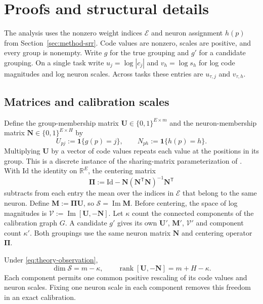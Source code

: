 \section{Proofs and structural details}
\label{app:theory-proofs}

The analysis uses the nonzero weight indices $\mathcal E$ and neuron
assignment $h(p)$ from Section~\ref{sec:method-srr}. Code values are
nonzero, scales are positive, and every group is nonempty.
Write $g$ for the true grouping and $g'$ for a candidate grouping.
On a single task write
$u_j=\log|c_j|$ and $v_h=\log s_h$ for log code magnitudes and
log neuron scales. Across tasks these entries are $u_{\tau,j}$
and $v_{\tau,h}$.

\subsection{Matrices and calibration scales}
\label{app:theory-dimension}

Define the group-membership matrix
$\mathbf U\in\{0,1\}^{E\times m}$ and the
neuron-membership matrix $\mathbf N\in\{0,1\}^{E\times H}$ by
\begin{equation}
    U_{pj}
        :=\mathbf1\{g(p)=j\},
    \qquad
    N_{ph}:=\mathbf1\{h(p)=h\}.
    \label{eq:theory-membership}
\end{equation}
Multiplying $\mathbf U$ by a vector of code values repeats each
value at the positions in its group. This is a discrete instance of
the sharing-matrix parameterization of \citet[Eq.~(2)]{zhou2021meta}.
With $\mathrm{Id}$ the identity on $\mathbb R^E$, the centering matrix
\begin{equation}
    \boldsymbol\Pi
    :=\mathrm{Id}-\mathbf N
        (\mathbf N^{\mathsf T}\mathbf N)^{-1}\mathbf N^{\mathsf T}
    \label{eq:theory-centering}
\end{equation}
subtracts from each entry the mean over the indices in $\mathcal E$
that belong to the same neuron.
Define $\mathbf M:=\boldsymbol\Pi\mathbf U$, so
$\mathcal S=\operatorname{Im}\mathbf M$. Before centering, the space
of log magnitudes is $\mathcal V:=\operatorname{Im}[\mathbf U,-\mathbf N]$.
Let $\kappa$ count the connected components of the calibration graph $G$.
A candidate $g'$ gives its own $\mathbf U'$, $\mathbf M'$, $\mathcal V'$
and component count $\kappa'$. Both groupings use the same neuron matrix
$\mathbf N$ and centering operator $\boldsymbol\Pi$.

\begin{proposition}
    \label{prop:theory-dimension}
    Under \eqref{eq:theory-observation},
    \begin{equation}
        \dim\mathcal S=m-\kappa,
        \qquad
        \operatorname{rank}[\mathbf U,-\mathbf N]
            =m+H-\kappa.
        \label{eq:theory-dimension}
    \end{equation}
    Each component permits one common positive rescaling of its
    code values and neuron scales. Fixing one neuron scale in each
    component removes this freedom in an exact calibration.
\end{proposition}


